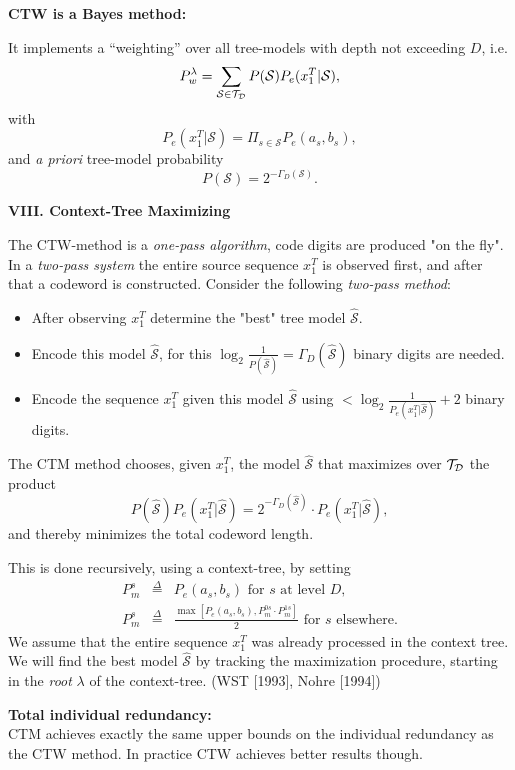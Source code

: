 \documentclass[a4paper,landscape]{slides} %
\newcommand{\cS}{{\mathcal{S}}}
\newcommand{\define}{\stackrel{\Delta}{=}}
\newcommand{\xT}{x_{1}^{T}}
\newcommand{\cTD}{{\cal{T}_{D}}}
\newcommand{\GD}{{\Gamma_{D}}}
\begin{document}
\begin{slide}{\bf\large\color{red} CTW is a Bayes method:}

It implements a ``weighting'' over all tree-models with depth not
exceeding $D$, i.e.
\[
P_{w}^{\lambda}
= \sum_{\cS \in \cTD} P(\cS) P_{e}(\xT |\cS),
\]
with
\[
P_{e}(\xT|\cS) = \Pi_{s\in\cS} P_{e}(a_{s},b_{s}),
\]
and {\em a priori} tree-model probability
\[
P(\cS) = 2^{-\GD(\cS)}.
\]
\end{slide}
\begin{slide}{\bf\Large\color{blue} VIII. Context-Tree Maximizing}

The CTW-method is a {\em one-pass algorithm}, code digits are produced "on the fly".
In a {\em two-pass system} the entire source sequence $\xT$ is observed first, and after that a codeword is constructed.
Consider the following {\em two-pass method}:
\begin{itemize}
\item\vspace{-10mm}
After observing $\xT$ determine the "best" tree model ${\mathcal{\widehat{S}}}$.
\item\vspace{-10mm}
Encode this model $\mathcal{\widehat{S}}$, for this $\log_{2}\frac{1}{P(\mathcal{\widehat{S}})}= \GD(\mathcal{\widehat{S}}) $ binary digits are needed.
\item\vspace{-10mm}
Encode the sequence $\xT$ given this model $\mathcal{\widehat{S}}$ using $< \log_{2}\frac{1}{P_e(\xT|\mathcal{\widehat{S}})} + 2$ binary digits.
\end{itemize}

The CTM method chooses, given $\xT$, the model $\mathcal{\widehat{S}}$ that maximizes over $\cTD$ the product
\[
P(\mathcal{\widehat{S}}) P_{e}(\xT| \mathcal{\widehat{S}} ) =
2^{-\GD(\mathcal{\widehat{S}}) } \cdot P_{e}( \xT|\mathcal{\widehat{S}}),
\]
and thereby minimizes the total codeword length.
\end{slide}
\begin{slide}
This is done recursively, using a context-tree, by setting
\begin{eqnarray*}
P_{m}^{s} &\define& P_{e}(a_{s},b_{s}) \text{ for $s$ at level $D$,} \\
P_{m}^{s} &\define& \frac{ \max [ P_{e}(a_{s},b_{s}) , P_{m}^{0s}\cdot
P_{m}^{1s} ] } {2} \text{ for $s$ elsewhere.}
\end{eqnarray*}
We assume that the entire sequence $\xT$ was already processed in the context tree.\\
We will find the best model ${\mathcal{\widehat{S}}}$ by tracking the
maximization procedure, starting in the {\em root} $\lambda$ of
the context-tree. (WST [1993], Nohre [1994])

{\bf Total individual redundancy:} \\
CTM achieves exactly the same upper bounds on
the individual redundancy as the CTW method. In practice CTW
achieves better results though.
\end{slide}
\end{document}

